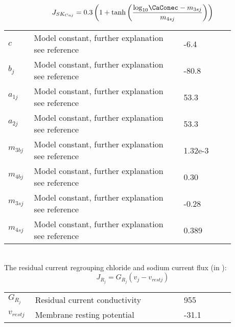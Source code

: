 \begin{equation} \label{eq:JSKCaj}
J_{SK_{Caj}} = 0.3\left( 1+ \mathrm{tanh}  \left(  \frac{   \mathrm{log}_{10} \CaConec -m_{3sj}  } {m_{4sj}}  \right)      \right) 
\end{equation}
%
\begin{table}[h!]
\centering
\begin{tabular}{| p{0.09\linewidth} | >{\footnotesize} p{0.6\linewidth} | >{\footnotesize} p{0.17\linewidth} | >{\footnotesize} p{0.02\linewidth} |}
\arrayrulecolor{lightgrey}\hline
$c$      				& Model constant, further explanation see reference					& -6.4 \uM			& \cite{Koenigsberger2006} \\
$b_{j}$      			& Model constant, further explanation see reference					& -80.8 \mV		& \cite{Koenigsberger2006} \\
$a_{1j}$      			& Model constant, further explanation see reference					& 53.3 \uMkeermV	& \cite{Koenigsberger2006} \\
$a_{2j}$      			& Model constant, further explanation see reference					& 53.3 \mVpuM		& \cite{Koenigsberger2006} \\
$m_{3bj}$      			& Model constant, further explanation see reference					& 1.32e-3 \uMpmV	& \cite{Koenigsberger2006} \\
$m_{4bj}$      			& Model constant, further explanation see reference					& 0.30	\uMkeermV	& \cite{Koenigsberger2006} \\
$m_{3sj}$      			& Model constant, further explanation see reference					& -0.28 \uM		& \cite{Koenigsberger2006} \\
$m_{4sj}$      			& Model constant, further explanation see reference					& 0.389 \uM		& \cite{Koenigsberger2006} \\
\hline
\end{tabular}
\label{tab:JBKCAj}
\end{table}
\\
%
The residual current regrouping chloride and sodium current flux (in \uMs):
\begin{equation} \label{eq:JRj}
J_{R_{j}} = G_{R_{j}} ( v_{j} - v_{rest j}  )
\end{equation}
%
\begin{table}[h!]
\centering
\begin{tabular}{| p{0.09\linewidth} | >{\footnotesize} p{0.6\linewidth} | >{\footnotesize} p{0.17\linewidth} | >{\footnotesize} p{0.02\linewidth} |}
\arrayrulecolor{lightgrey}\hline
$G_{R_{j}}$      		& Residual current conductivity										& 955 \pS			& \cite{Koenigsberger2006} \\
$v_{rest j}$      		& Membrane resting potential						 				& -31.1 \mV		& \cite{Koenigsberger2006} \\
\hline
\end{tabular}
\label{tab:JRj}
\end{table}
